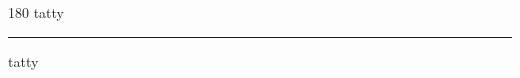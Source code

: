 
\begin{frame}
\begin{center}
\begin{turn}{180}
{\fontsize{2.5cm}{1em}\selectfont tatty}
\end{turn}
\vspace{1em}\par  
\hrule
\vspace{1em}\par  
{\fontsize{2.5cm}{1em}\selectfont tatty}
\end{center}
\end{frame}
